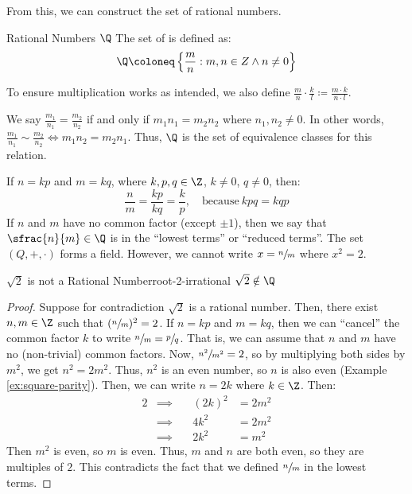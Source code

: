 From this, we can construct the set of rational numbers.

\begin{dfnbox}{Rational Numbers $\Q$}{}
    The set of  is defined as:
    \[ \Q \coloneq \left\{ \frac{m}{n} : m,n \in Z \land n \neq 0 \right\} \]
\end{dfnbox}

To ensure multiplication works as intended, we also define $\frac{m}{n} \cdot \frac{k}{l} \coloneq \frac{m \cdot k}{n \cdot l}$.

We say $\frac{m_1}{n_1} = \frac{m_2}{n_2}$ if and only if $m_1n_1 = m_2n_2$ where $n_1, n_2 \neq 0$. In other words, $\frac{m_1}{n_1} \sim \frac{m_2}{n_2} \iff m_1n_2 = m_2n_1$. Thus, $\Q$ is the set of equivalence classes for this relation.

If $n = kp$ and $m = kq$, where $k,p,q \in \Z$, $k \neq 0$, $q \neq 0$, then:
\[ \frac{n}{m} = \frac{kp}{kq} = \frac{k}{p}, \quad \text{because}\ kpq = kqp \]
If $n$ and $m$ have no common factor (except $\pm 1$), then we say that $\sfrac{n}{m} \in \Q$ is in the ``lowest terms'' or ``reduced terms''. The set $(Q, +, \cdot)$ forms a field. However, we cannot write $x = \sfrac{n}{m}$ where $x^2 = 2$. 

\begin{thmbox}{$\sqrt{2}$ is not a Rational Number}{root-2-irrational}
    $\sqrt{2} \notin \Q$
    \tcblower
    \begin{proof}
        Suppose for contradiction $\sqrt{2}$ is a rational number. Then, there exist $n,m \in \Z$ such that $(\sfrac{n}{m})^2 = 2$. If $n = kp$ and $m = kq$, then we can ``cancel'' the common factor $k$ to write $\sfrac{n}{m} = \sfrac{p}{q}$. That is, we can assume that $n$ and $m$ have no (non-trivial) common factors.
        Now, $\sfrac{n^2}{m^2} = 2$, so by multiplying both sides by $m^2$, we get $n^2 = 2m^2$. Thus, $n^2$ is an even number, so $n$ is also even (Example \ref{ex:square-parity}). Then, we can write $n = 2k$ where $k \in \Z$. Then:
            \begin{alignat*}{2}
                & \implies \quad & (2k)^2 &= 2m^2 \\
                & \implies \quad & 4k^2 &= 2m^2 \\
                & \implies \quad & 2k^2 &= m^2
            \end{alignat*}
            Then $m^2$ is even, so $m$ is even. Thus, $m$ and $n$ are both even, so they are multiples of $2$. This contradicts the fact that we defined $\sfrac{n}{m}$ in the lowest terms.
    \end{proof}
\end{thmbox}

